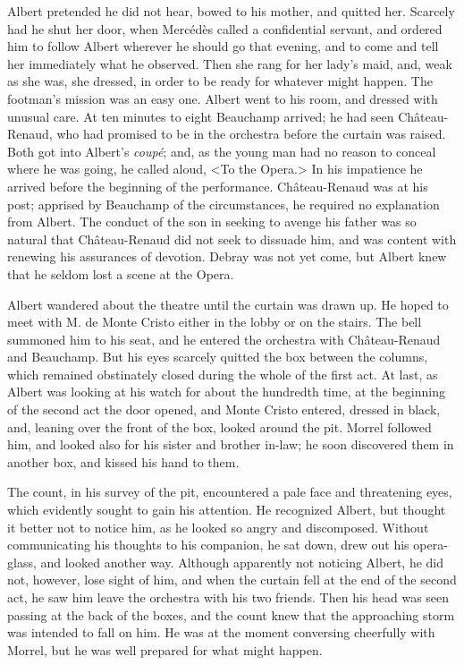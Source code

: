  Albert pretended he did not hear, bowed to his mother, and quitted her. Scarcely had he shut her door, when Mercédès called a confidential servant, and ordered him to follow Albert wherever he should go that evening, and to come and tell her immediately what he observed. Then she rang for her lady's maid, and, weak as she was, she dressed, in order to be ready for whatever might happen. The footman's mission was an easy one. Albert went to his room, and dressed with unusual care. At ten minutes to eight Beauchamp arrived; he had seen Château-Renaud, who had promised to be in the orchestra before the curtain was raised. Both got into Albert's \textit{coupé}; and, as the young man had no reason to conceal where he was going, he called aloud, <To the Opera.> In his impatience he arrived before the beginning of the performance.  Château-Renaud was at his post; apprised by Beauchamp of the circumstances, he required no explanation from Albert. The conduct of the son in seeking to avenge his father was so natural that Château-Renaud did not seek to dissuade him, and was content with renewing his assurances of devotion. Debray was not yet come, but Albert knew that he seldom lost a scene at the Opera. 

 Albert wandered about the theatre until the curtain was drawn up. He hoped to meet with M. de Monte Cristo either in the lobby or on the stairs. The bell summoned him to his seat, and he entered the orchestra with Château-Renaud and Beauchamp. But his eyes scarcely quitted the box between the columns, which remained obstinately closed during the whole of the first act. At last, as Albert was looking at his watch for about the hundredth time, at the beginning of the second act the door opened, and Monte Cristo entered, dressed in black, and, leaning over the front of the box, looked around the pit. Morrel followed him, and looked also for his sister and brother in-law; he soon discovered them in another box, and kissed his hand to them. 

 The count, in his survey of the pit, encountered a pale face and threatening eyes, which evidently sought to gain his attention. He recognized Albert, but thought it better not to notice him, as he looked so angry and discomposed. Without communicating his thoughts to his companion, he sat down, drew out his opera-glass, and looked another way. Although apparently not noticing Albert, he did not, however, lose sight of him, and when the curtain fell at the end of the second act, he saw him leave the orchestra with his two friends. Then his head was seen passing at the back of the boxes, and the count knew that the approaching storm was intended to fall on him. He was at the moment conversing cheerfully with Morrel, but he was well prepared for what might happen. 

